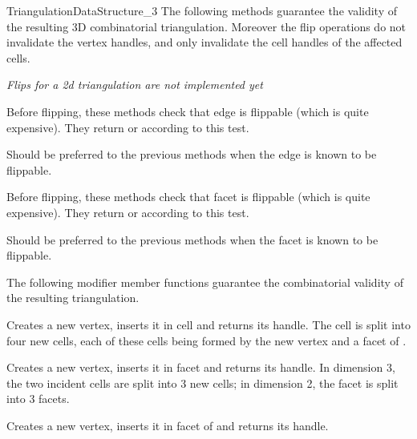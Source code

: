 \begin{ccRefConcept}{TriangulationDataStructure_3}
The following methods guarantee the validity of the resulting 3D
combinatorial triangulation.  Moreover the flip operations do not
invalidate the vertex handles, and only invalidate the cell
handles of the affected cells.

\textit{Flips for a 2d triangulation are not implemented yet}

\ccGlue
{}
{Before flipping, these methods check that edge  is
flippable (which is quite expensive). They return  or
 according to this test.}

\ccGlue
{}
{Should be preferred to the previous methods when the edge is
known to be flippable.
}

\ccGlue
{}
{Before flipping, these methods check that facet  is
flippable (which is quite expensive). They return  or
 according to this test.} 

\ccGlue
{}
{Should be preferred to the previous methods when the facet is
known to be flippable.
}


The following modifier member functions guarantee
the combinatorial validity of the resulting triangulation.

{Creates a new vertex, inserts it in cell  and returns its handle.
The cell  is split into four new cells, each of these cells being
formed by the new vertex and a facet of .
}

{Creates a new vertex, inserts it in facet  and returns its handle.
In dimension 3, the two incident cells are split into 3 new cells;
in dimension 2, the facet is split into 3 facets.
} 

{Creates a new vertex, inserts it in facet  of  and returns its
handle.
} 


\end{ccRefConcept}
